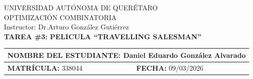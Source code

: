 \begin{center}

\LARGE
UNIVERSIDAD AUTÓNOMA DE QUERÉTARO \\
OPTIMIZACIÓN COMBINATORIA \\[0.3cm]

\Large
Instructor: Dr.Arturo González Gutiérrez \\
\large
\textbf{TAREA \#3: PELICULA ``TRAVELLING SALESMAN''}\\

\begin{table}[h]
\centering
\begin{tabular}{|p{8cm}|p{6cm}|}
\hline
\multicolumn{2}{|l|}{\textbf{NOMBRE DEL ESTUDIANTE:} Daniel Eduardo González Alvarado} \\[0.5cm]
\hline
\textbf{MATRÍCULA:} 338044 & \textbf{FECHA:} 09/03/2026 \\[0.5cm]
\hline
\end{tabular}
\end{table}

\end{center}